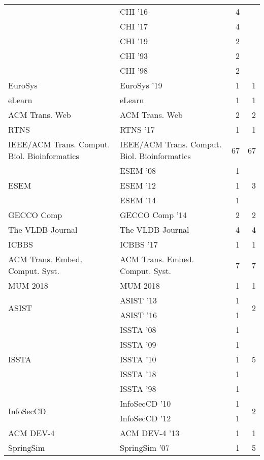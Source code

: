 \begin{table*}[t]
\begin{tabular}{llrr}
& CHI '16 & 4 &\\
& CHI '17 & 4 &\\
& CHI '19 & 2 &\\
& CHI '93 & 2 &\\
& CHI '98 & 2 &\\
\multirow{1}{*}{EuroSys } & EuroSys '19 & 1 & \multirow{1}{*}{1}\\
\multirow{1}{*}{eLearn} & eLearn & 1 & \multirow{1}{*}{1}\\
\multirow{1}{*}{ACM Trans. Web} & ACM Trans. Web & 2 & \multirow{1}{*}{2}\\
\multirow{1}{*}{RTNS } & RTNS '17 & 1 & \multirow{1}{*}{1}\\
\multirow{1}{*}{IEEE/ACM Trans. Comput. Biol. Bioinformatics} & IEEE/ACM Trans. Comput. Biol. Bioinformatics & 67 & \multirow{1}{*}{67}\\
\multirow{3}{*}{ESEM } & ESEM '08 & 1 & \multirow{3}{*}{3}\\
& ESEM '12 & 1 &\\
& ESEM '14 & 1 &\\
\multirow{1}{*}{GECCO Comp } & GECCO Comp '14 & 2 & \multirow{1}{*}{2}\\
\multirow{1}{*}{The VLDB Journal} & The VLDB Journal & 4 & \multirow{1}{*}{4}\\
\multirow{1}{*}{ICBBS } & ICBBS '17 & 1 & \multirow{1}{*}{1}\\
\multirow{1}{*}{ACM Trans. Embed. Comput. Syst.} & ACM Trans. Embed. Comput. Syst. & 7 & \multirow{1}{*}{7}\\
\multirow{1}{*}{MUM 2018} & MUM 2018 & 1 & \multirow{1}{*}{1}\\
\multirow{2}{*}{ASIST } & ASIST '13 & 1 & \multirow{2}{*}{2}\\
& ASIST '16 & 1 &\\
\multirow{5}{*}{ISSTA } & ISSTA '08 & 1 & \multirow{5}{*}{5}\\
& ISSTA '09 & 1 &\\
& ISSTA '10 & 1 &\\
& ISSTA '18 & 1 &\\
& ISSTA '98 & 1 &\\
\multirow{2}{*}{InfoSecCD } & InfoSecCD '10 & 1 & \multirow{2}{*}{2}\\
& InfoSecCD '12 & 1 &\\
\multirow{1}{*}{ACM DEV-4 } & ACM DEV-4 '13 & 1 & \multirow{1}{*}{1}\\
\multirow{4}{*}{SpringSim } & SpringSim '07 & 1 & \multirow{4}{*}{5}\\

\end{tabular}
\end{table*}
